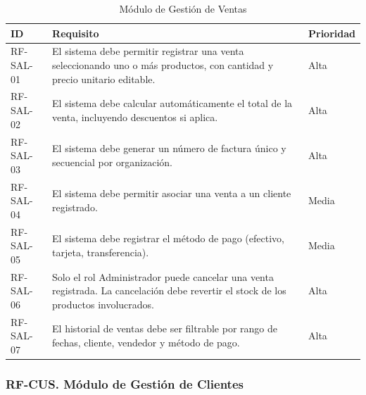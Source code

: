 \begin{longtable}[]{@{}
  >{\raggedright\arraybackslash}p{}
  >{\raggedright\arraybackslash}p{}
  >{\raggedright\arraybackslash}p{}@{}}
\caption[Módulo de Gestión de Ventas]{Módulo de Gestión de Ventas}\tabularnewline
\toprule\noalign{}
\begin{minipage}[b]{\linewidth}\raggedright
ID
\end{minipage} & \begin{minipage}[b]{\linewidth}\raggedright
Requisito
\end{minipage} & \begin{minipage}[b]{\linewidth}\raggedright
Prioridad
\end{minipage} \\
\midrule\noalign{}
\endhead
\bottomrule\noalign{}
\endlastfoot
RF-SAL-01 & El sistema debe permitir registrar una venta seleccionando uno o más productos, con cantidad y precio unitario editable. & Alta \\
RF-SAL-02 & El sistema debe calcular automáticamente el total de la venta, incluyendo descuentos si aplica. & Alta \\
RF-SAL-03 & El sistema debe generar un número de factura único y secuencial por organización. & Alta \\
RF-SAL-04 & El sistema debe permitir asociar una venta a un cliente registrado. & Media \\
RF-SAL-05 & El sistema debe registrar el método de pago (efectivo, tarjeta, transferencia). & Media \\
RF-SAL-06 & Solo el rol Administrador puede cancelar una venta registrada. La cancelación debe revertir el stock de los productos involucrados. & Alta \\
RF-SAL-07 & El historial de ventas debe ser filtrable por rango de fechas, cliente, vendedor y método de pago. & Alta \\
\end{longtable}

\subsubsection{RF-CUS. Módulo de Gestión de Clientes}\label{rf-cus.-muxf3dulo-de-gestiuxf3n-de-clientes}

